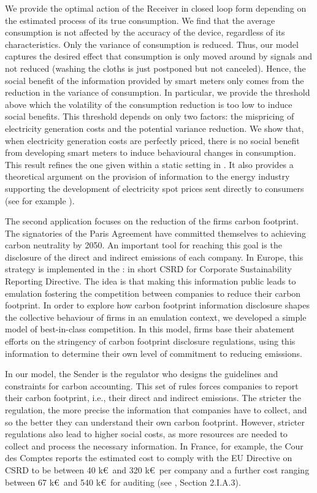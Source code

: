 \documentclass[a4paper,10pt]{article}
\theoremstyle{definition}
\theoremstyle{plain}
\numberwithin{equation}{section}
\begin{document}
We provide the optimal action of the Receiver in closed loop form depending on the estimated process of its true consumption. We find that the average consumption is not affected by the accuracy of the device, regardless of its characteristics. Only the variance of consumption is reduced. Thus, our model captures the desired effect that consumption is only moved around by signals and not reduced (washing the cloths is just postponed but not canceled). Hence, the social benefit of the information provided by smart meters only comes from the reduction in the variance of consumption.  In particular, we provide the threshold above which the volatility of the consumption reduction is too low to induce social benefits. This threshold depends on only two factors: the mispricing of electricity generation costs and the potential variance reduction. We show that, when electricity generation costs are perfectly priced, there is no social benefit from developing smart meters to induce behavioural changes in consumption. This result refines the one given within a static setting in \cite{Aid23}. It also provides a theoretical argument on the provision of information to the energy industry supporting the development of electricity spot prices sent directly to consumers (see for example \cite{Wolak11}). 

\medskip

The second application focuses on the reduction of the firms carbon footprint. The signatories of the Paris Agreement have committed themselves to achieving carbon neutrality by 2050. An important tool for reaching this goal is the disclosure of the direct and indirect emissions of each company.  In Europe, this strategy is implemented in the \cite{Directive22}: in short CSRD for Corporate Sustainability Reporting Directive.  The idea is that making this information public leads to emulation fostering the competition between companies to reduce their carbon footprint. In order to explore how carbon footprint information disclosure shapes the collective behaviour of firms in an emulation context, we developed a simple model of best-in-class competition.  In this model, firms base their abatement efforts on the stringency of carbon footprint disclosure regulations, using this information to determine their own level of commitment to reducing emissions.

In our model, the Sender is the regulator who designs the guidelines and constraints for carbon accounting. This set of rules forces companies to report their carbon footprint, i.e.,  their direct and indirect emissions. The stricter the regulation, the more precise the information that companies have to collect, and so the better they can understand their own carbon footprint. However, stricter regulations also lead to higher social costs, as more resources are needed to collect and process the necessary information. 
In France, for example, the Cour des Comptes reports the estimated cost to comply with the EU Directive on CSRD to be between 40 k\euro~and 320 k\euro~per company  and a further cost ranging between 67 k\euro~and 540 k\euro~for auditing (see \cite{Cour24}, Section 2.I.A.3). 
\end{document}
